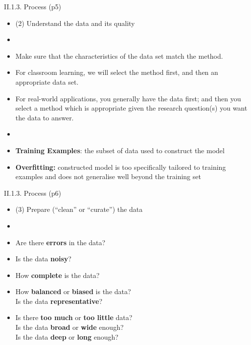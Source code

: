\documentclass[handout]{beamer}
\newcommand{\strong}[1]{\textbf{\color{teal} #1}}
\begin{document}
\begin{frame}{II.1.3. Process (p5)}
\begin{itemize}
\item[] (2) Understand the data and its quality
\item[]
\item Make sure that the characteristics of the data set match the method.
\item For classroom learning, we will select the method first, and then an appropriate data set.
\item For real-world applications, you generally have the data first; and then you select a method which is appropriate given the research question(s) you want the data to answer.
\item[]
\item \strong{Training Examples}: the subset of data used to construct the model
\item \strong{Overfitting:} constructed model is too specifically tailored to training examples and does not generalise well beyond the training set
\end{itemize}
\end{frame}
\begin{frame}{II.1.3. Process (p6)}
\begin{itemize}
\item[] (3) Prepare (``clean'' or ``curate'') the data
\item[]
\item Are there \strong{errors} in the data?
\item Is the data \strong{noisy}?
\item How \strong{complete} is the data?
\item How \strong{balanced} or \strong{biased} is the data?\\
	Is the data \strong{representative}?
\item Is there \strong{too much} or \strong{too little} data?\\
	Is the data \strong{broad} or \strong{wide} enough?\\
	Is the data \strong{deep} or \strong{long} enough?
\end{itemize}
\end{frame}
\end{document}
